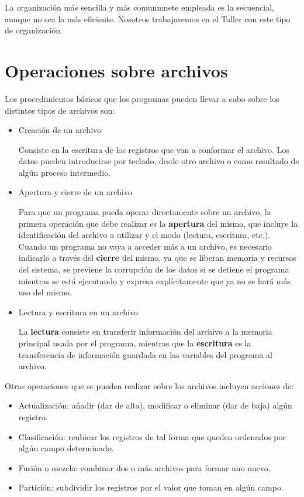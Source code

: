 \documentclass[]{book}
\providecommand{\tightlist}{%
  \setlength{\itemsep}{0pt}\setlength{\parskip}{0pt}}
\begin{document}
La organización más sencilla y más comunmnete empleada es la secuencial,
aunque no sea la más eficiente. Nosotros trabajaremos en el Taller con
este tipo de organización.

\section{Operaciones sobre archivos}\label{operaciones-sobre-archivos}

Los procedimientos básicos que los programas pueden llevar a cabo sobre
los distintos tipos de archivos son:

\begin{itemize}
\item
  Creación de un archivo

  Consiste en la escritura de los registros que van a conformar el
  archivo. Los datos pueden introducirse por teclado, desde otro archivo
  o como resultado de algún proceso intermedio.
\item
  Apertura y cierre de un archivo

  Para que un programa pueda operar directamente sobre un archivo, la
  primera operación que debe realizar es la \textbf{apertura} del mismo,
  que incluye la identificación del archivo a utilizar y el modo
  (lectura, escritura, etc.). Cuando un programa no vaya a acceder más a
  un archivo, es necesario indicarlo a través del \textbf{cierre} del
  mismo, ya que se liberan memoria y recursos del sistema, se previene
  la corrupción de los datos si se detiene el programa mientras se está
  ejecutando y expresa explícitamente que ya no se hará más uso del
  mismo.
\item
  Lectura y escritura en un archivo

  La \textbf{lectura} consiste en transferir información del archivo a
  la memoria principal usada por el programa, mientras que la
  \textbf{escritura} es la transferencia de información guardada en las
  variables del programa al archivo.
\end{itemize}

Otras operaciones que se pueden realizar sobre los archivos incluyen
acciones de:

\begin{itemize}
\tightlist
\item
  Actualización: añadir (dar de alta), modificar o eliminar (dar de
  baja) algún registro.
\item
  Clasificación: reubicar los registros de tal forma que queden
  ordenados por algún campo determinado.
\item
  Fusión o mezcla: combinar dos o más archivos para formar uno nuevo.
\item
  Partición: subdividir los registros por el valor que toman en algún
  campo.
\end{itemize}
\end{document}
